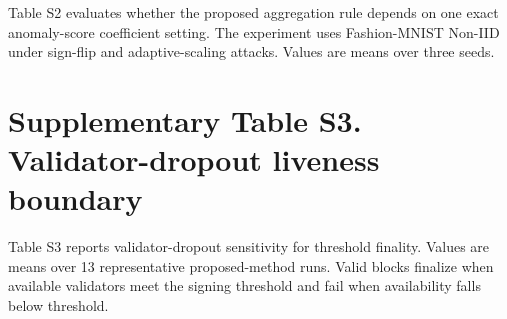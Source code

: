 \documentclass[12pt]{article}
\begin{document}
Table S2 evaluates whether the proposed aggregation rule depends on one exact anomaly-score coefficient setting. The experiment uses Fashion-MNIST Non-IID under sign-flip and adaptive-scaling attacks. Values are means over three seeds.

\begin{table}[h]
\centering
\caption*{S2. Coefficient sensitivity of the proposed method.}
\end{table}

\section*{Supplementary Table S3. Validator-dropout liveness boundary}

Table S3 reports validator-dropout sensitivity for threshold finality. Values are means over 13 representative proposed-method runs. Valid blocks finalize when available validators meet the signing threshold and fail when availability falls below threshold.
\end{document}
